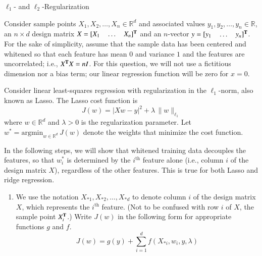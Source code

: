 \documentclass[section]{problemset}
\newcommand{\argmin}{\mathrm{argmin}}
\begin{document}
\newpage


\begin{problem}{$\ell_1$- and $\ell_2$-Regularization}


Consider sample points $X_1, X_2, \ldots, X_n \in \mathbb{R}^d$ and
associated values $y_1, y_2, \ldots, y_n \in \mathbb{R}$,
an $n \times d$ design matrix $X = [X_1~~~~\dots~~~~X_n]^{\mathbf{T}}$ and
an $n$-vector $y = [y_1~~~~\dots~~~~y_n]^{\mathbf{T}}$.
For the sake of simplicity, assume that the sample data
has been centered and whitened so that
each feature has mean $0$ and variance $1$ and the features are uncorrelated;
i.e., $X^{\mathbf{T}} X = nI$.
For this question, we will not use a fictitious dimension nor a bias term;
our linear regression function will be zero for $x = 0$.

Consider linear least-squares regression with
regularization in the $\ell_1$-norm, also known as Lasso.
The Lasso cost function is
\[
J(w) = |Xw - y|^2 +\lambda \, \|w\|_{\ell_1}
\]
where $w \in \mathbb{R}^d$ and $\lambda > 0$ is the regularization parameter.
Let $w^* = \argmin_{w \in \mathbb{R}^d} \, J(w)$ denote
the weights that minimize the cost function.

In the following steps, we will show that whitened training data decouples the features, so that $w^*_i$ is determined by the $i^\mathrm{th}$ feature alone (i.e., column $i$ of the design matrix $X$), regardless of the other features.  This is true for both Lasso and ridge regression.

\begin{enumerate}
\item
We use the notation $X_{*1}, X_{*2}, \ldots, X_{*d}$ to denote column $i$ of the design matrix $X$, which represents the $i^\mathrm{th}$ feature.
(Not to be confused with row $i$ of $X$, the sample point $X_i^{\mathbf{T}}$.)
Write $J(w)$ in the following form for appropriate functions $g$ and $f$.
\[
J(w) = g(y) + \sum_{i=1}^d f(X_{*i}, w_i, y, \lambda)
\]


\end{enumerate}
\end{problem}
\end{document}
